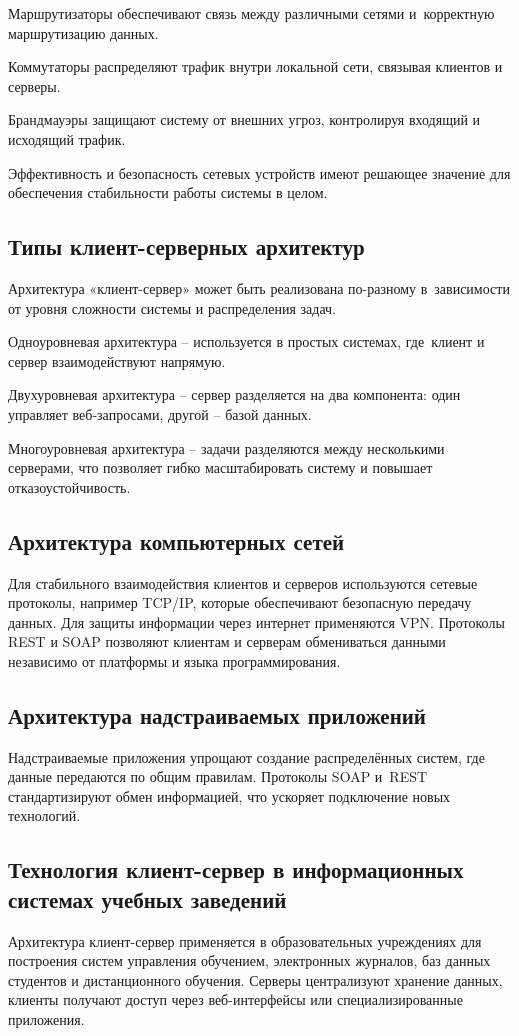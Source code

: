 \documentclass{ou}
\begin{document}
Маршрутизаторы обеспечивают связь между различными сетями и~корректную
маршрутизацию данных.

Коммутаторы распределяют трафик внутри локальной сети, связывая клиентов и
серверы.

Брандмауэры защищают систему от внешних угроз, контролируя входящий и
исходящий трафик.

Эффективность и безопасность сетевых устройств имеют решающее значение
для обеспечения стабильности работы системы в целом.
\subsection{Типы клиент-серверных архитектур}
Архитектура «клиент-сервер» может быть реализована по-разному в~зависимости
от уровня сложности системы и распределения задач.

Одноуровневая архитектура -- используется в простых системах, где~клиент и
сервер взаимодействуют напрямую.

Двухуровневая архитектура -- сервер разделяется на два компонента: один
управляет веб-запросами, другой -- базой данных.

Многоуровневая архитектура -- задачи разделяются между несколькими
серверами, что позволяет гибко масштабировать систему и повышает
отказоустойчивость.
\subsection{Архитектура компьютерных сетей}
Для стабильного взаимодействия клиентов и серверов используются сетевые
протоколы, например TCP/IP, которые обеспечивают безопасную передачу
данных. Для защиты информации через интернет применяются VPN.
Протоколы REST и SOAP позволяют клиентам и серверам обмениваться данными
независимо от платформы и языка программирования.
\subsection{Архитектура надстраиваемых приложений}
Надстраиваемые приложения упрощают создание распределённых систем, где
данные передаются по общим правилам. Протоколы SOAP и~REST
стандартизируют обмен информацией, что ускоряет подключение новых
технологий.
\subsection{Технология клиент-сервер в информационных системах учебных
заведений}
Архитектура клиент-сервер применяется в образовательных учреждениях
для построения систем управления обучением, электронных журналов, баз
данных студентов и дистанционного обучения. Серверы централизуют
хранение данных, клиенты получают доступ через веб-интерфейсы или специализированные приложения.
\end{document}
